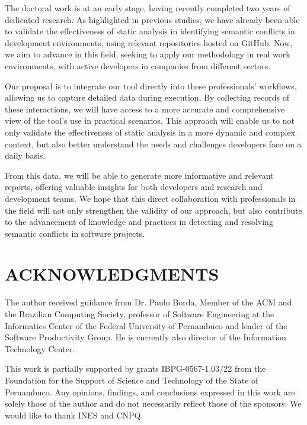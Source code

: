\documentclass[sigconf,review]{acmart}
\begin{document}
The doctoral work is at an early stage, having recently completed two years of dedicated research. As highlighted in previous studies, we have already been able to validate the effectiveness of static analysis in identifying semantic conflicts in development environments, using relevant repositories hosted on GitHub. Now, we aim to advance in this field, seeking to apply our methodology in real work environments, with active developers in companies from different sectors.

Our proposal is to integrate our tool directly into these professionals' workflows, allowing us to capture detailed data during execution. By collecting records of these interactions, we will have access to a more accurate and comprehensive view of the tool's use in practical scenarios. This approach will enable us to not only validate the effectiveness of static analysis in a more dynamic and complex context, but also better understand the needs and challenges developers face on a daily basis.

From this data, we will be able to generate more informative and relevant reports, offering valuable insights for both developers and research and development teams. We hope that this direct collaboration with professionals in the field will not only strengthen the validity of our approach, but also contribute to the advancement of knowledge and practices in detecting and resolving semantic conflicts in software projects.

\section*{ACKNOWLEDGMENTS}
The author received guidance from Dr. Paulo Borda, Member of the ACM and the Brazilian Computing Society, professor of Software Engineering at the Informatics Center of the Federal University of Pernambuco and leader of the Software Productivity Group. He is currently also director of the Information Technology Center.

This work is partially supported by grants IBPG-0567-1.03/22 from the Foundation for the Support of Science and Technology of the State of Pernambuco. Any opinions, findings, and conclusions expressed in this work are solely those of the author and do not necessarily reflect those of the sponsors. We would like to thank INES and CNPQ.




\end{document}
